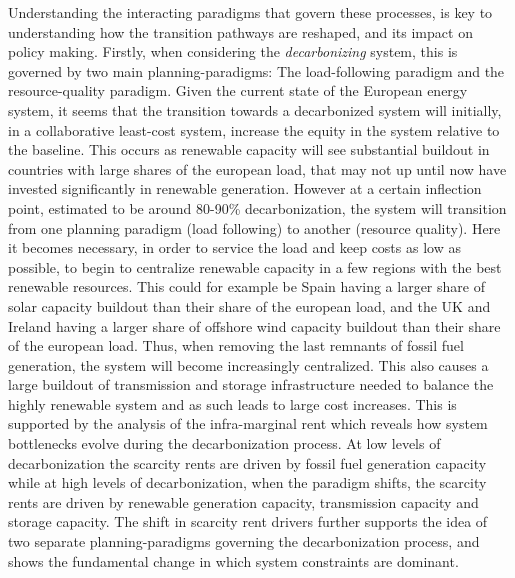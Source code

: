 \documentclass[preprint,12pt,nopreprintline]{elsarticle}
\begin{document}
\medskip
\noindent
Understanding the interacting paradigms that govern these processes, is key to understanding how the transition pathways are reshaped, and its impact on policy making. Firstly, when considering the \textit{decarbonizing} system, this is governed by two main planning-paradigms: The load-following paradigm and the resource-quality paradigm. Given the current state of the European energy system, it seems that the transition towards a decarbonized system will initially, in a collaborative least-cost system, increase the equity in the system relative to the baseline. This occurs as renewable capacity will see substantial buildout in countries with large shares of the european load, that may not up until now have invested significantly in renewable generation. However at a certain inflection point, estimated to be around 80-90\% decarbonization, the system will transition from one planning paradigm (load following) to another (resource quality). Here it becomes necessary, in order to service the load and keep costs as low as possible, to begin to centralize renewable capacity in a few regions with the best renewable resources. This could for example be Spain having a larger share of solar capacity buildout than their share of the european load, and the UK and Ireland having a larger share of offshore wind capacity buildout than their share of the european load. Thus, when removing the last remnants of fossil fuel generation, the system will become increasingly centralized. This also causes a large buildout of transmission and storage infrastructure needed to balance the highly renewable system and as such leads to large cost increases. This is supported by the analysis of the infra-marginal rent which reveals how system bottlenecks evolve during the decarbonization process. At low levels of decarbonization the scarcity rents are driven by fossil fuel generation capacity while at high levels of decarbonization, when the paradigm shifts, the scarcity rents are driven by renewable generation capacity, transmission capacity and storage capacity. The shift in scarcity rent drivers further supports the idea of two separate planning-paradigms governing the decarbonization process, and shows the fundamental change in which system constraints are dominant.
\end{document}

